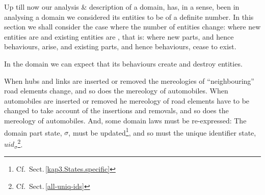
\label{Discrete Dynamic Domains}

\begynd
\pind Up till now our analysis \& description of a domain, 
\begynd
\pind has, in a sense, been 
\pind in analysing a domain we considered its entities
\pind to be of a definite number.
\afslut
\pind In this section we shall consider the case \nyl
      where the number of entities change:
\begynd
\pind where new entities are 
\pind and existing entities are ,
\pind that is:
\begynd
\pind where new parts, and hence behaviours, arise, and
\pind existing parts, and hence behaviours, cease to exist.
\afslut
\afslut
\afslut

\label{Create and Destroy Entities}

\begynd
\pind In the domain we can expect that its behaviours \nyl
      create and destroy entities.
\afslut


\mnewfoil
\noindent
\begynd
\pind {}
\begynd
\pind When hubs and links are inserted or removed
\begynd
\pind the mereologies of ``neighbouring'' road elements change,
\pind and so does the mereology of automobiles.
\afslut
\pind When automobiles are inserted or removed  
\begynd
\pind {}he mereology of road elements 
\pind have to be changed 
\pind to take account of the insertions and removals,
\pind and so does the mereology of automobiles.
\afslut
\pind And, some domain laws must be re-expressed:
\begynd
\pind The domain part state, $\sigma$, must be updated\footnote{\LLLL Cf.\ Sect.\,\vref{kap3.States.specific}},
\pind and so must the unique identifier state, ${uid}_{\sigma}$\footnote{\LLLL Cf.\ Sect.\,\vref{all-uniq-ids}}.
\afslut
\afslut
\afslut

